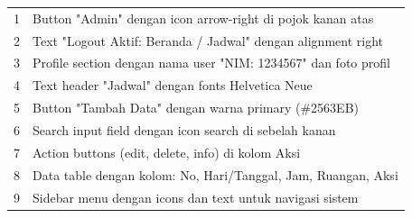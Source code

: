 \begin{enumerate}
{\begin{longtable}{c p{}}
		      1                       & Button "Admin" dengan icon arrow-right di pojok kanan atas                                  \\
		      2                       & Text "Logout Aktif: Beranda / Jadwal" dengan alignment right                                \\
		      3                       & Profile section dengan nama user "NIM: 1234567" dan foto profil                             \\
		      4                       & Text header "Jadwal" dengan fonts Helvetica Neue                                            \\
		      5                       & Button "Tambah Data" dengan warna primary (\#2563EB)                                        \\
		      6                       & Search input field dengan icon search di sebelah kanan                                      \\
		      7                       & Action buttons (edit, delete, info) di kolom Aksi                                           \\
		      8                       & Data table dengan kolom: No, Hari/Tanggal, Jam, Ruangan, Aksi                               \\
		      9                       & Sidebar menu dengan icons dan text untuk navigasi sistem                                    \\
		      \hline
	      \end{longtable}
	      }


\end{enumerate}
